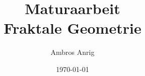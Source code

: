 

\title{Maturaarbeit \\ Fraktale Geometrie}
\author{Ambros Anrig}
\date{\today}



\maketitle
\thispagestyle{empty}

\clearpage
\tableofcontents
\thispagestyle{empty}










